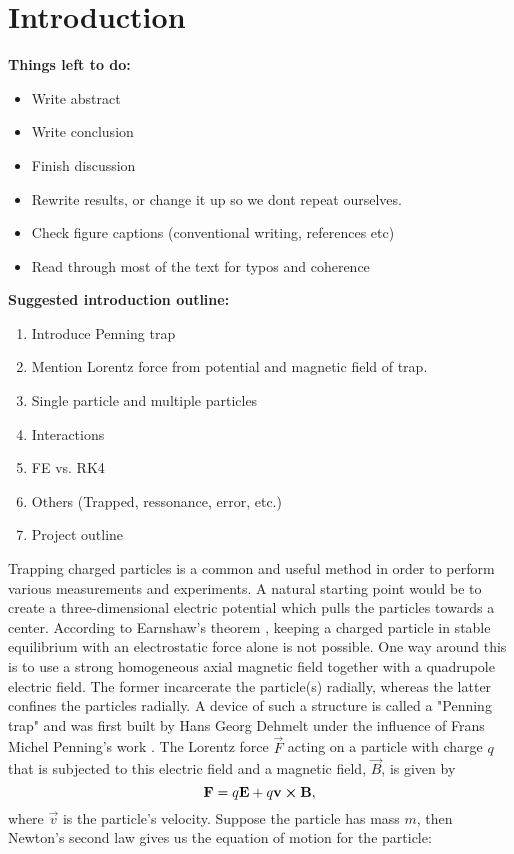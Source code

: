 \section{Introduction}\label{sec:introduction}


\textbf{Things left to do:}
\begin{itemize}
    \item Write abstract
    \item Write conclusion
    \item Finish discussion
    \item Rewrite results, or change it up so we dont repeat ourselves. 
    \item Check figure captions (conventional writing, references etc)
    \item Read through most of the text for typos and coherence
\end{itemize}


\textbf{Suggested introduction outline:}
\begin{enumerate}
    \item Introduce Penning trap 
    \item Mention Lorentz force from potential and magnetic field of trap. 
    \item Single particle and multiple particles 
    \item Interactions 
    \item FE vs. RK4 
    \item Others (Trapped, ressonance, error, etc.)
    \item Project outline 
\end{enumerate}

Trapping charged particles is a common and useful method in order to perform various measurements and experiments. A natural starting point would be to create a three-dimensional electric potential which pulls the particles towards a center. According to Earnshaw's theorem \citep{GriffithsEarnshaw}, keeping a charged particle in stable equilibrium with an electrostatic force alone is not possible. One way around this is to use a strong homogeneous axial magnetic field together with a quadrupole electric field. The former incarcerate the particle(s) radially, whereas the latter confines the particles radially. A device of such a structure is called a "Penning trap" and was first built by Hans Georg Dehmelt under the influence of Frans Michel Penning's work \citep{Dehmelt1989}. The Lorentz force $\vec{F}$ acting on a particle with charge $q$ that is subjected to this electric field and a magnetic field, $\vec{B}$, is given by 
\begin{equation}\label{eq:lorentz_force}
    \mathbf{F} = q\mathbf{E} + q \mathbf{v} \cross \mathbf{B},
\end{equation}
where $\vec{v}$ is the particle's velocity. Suppose the particle has mass $m$, then Newton's second law gives us the equation of motion for the particle:

